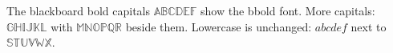 \documentclass{article}
\begin{document}
The blackboard bold capitals $\mathbb{ABCDEF}$ show the bbold font.
More capitals: $\mathbb{GHIJKL}$ with $\mathbb{MNOPQR}$ beside them.
Lowercase is unchanged: $abcdef$ next to $\mathbb{STUVWX}$.
\end{document}
